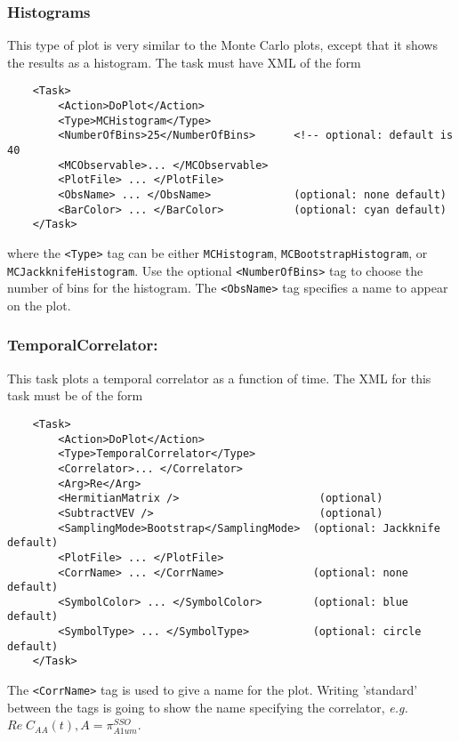 \documentclass[12pt]{article}
\newcommand{\vb}{\texttt}
\begin{document}
\subsubsection{Histograms}
This type of plot is very similar to the Monte Carlo plots, except that it shows the results
as a histogram. The task must have XML of the form
\begin{verbatim}
    <Task>
        <Action>DoPlot</Action>
        <Type>MCHistogram</Type>
        <NumberOfBins>25</NumberOfBins>      <!-- optional: default is 40
        <MCObservable>... </MCObservable>
        <PlotFile> ... </PlotFile>
        <ObsName> ... </ObsName>             (optional: none default)
        <BarColor> ... </BarColor>           (optional: cyan default)
    </Task>
\end{verbatim}
where the \vb{<Type>} tag can be either \vb{MCHistogram}, \vb{MCBootstrapHistogram}, or
\vb{MCJackknifeHistogram}. Use the optional \vb{<NumberOfBins>} tag to
choose the number of bins for the histogram.
The \vb{<ObsName>} tag specifies a name to appear on the plot.

\subsubsection{TemporalCorrelator:}

This task plots a temporal correlator as a function of time. The XML for this task must be of the form
\begin{verbatim}
    <Task>
        <Action>DoPlot</Action>
        <Type>TemporalCorrelator</Type>
        <Correlator>... </Correlator>
        <Arg>Re</Arg>
        <HermitianMatrix />                      (optional)
        <SubtractVEV />                          (optional)
        <SamplingMode>Bootstrap</SamplingMode>  (optional: Jackknife default)
        <PlotFile> ... </PlotFile>
        <CorrName> ... </CorrName>              (optional: none default)
        <SymbolColor> ... </SymbolColor>        (optional: blue default)
        <SymbolType> ... </SymbolType>          (optional: circle default)
    </Task> 
\end{verbatim}
The \vb{<CorrName>} tag is used to give a name for the plot.
Writing 'standard' between the tags is going to show the name specifying the correlator, 
\textit{e.g.} $Re \; C_{AA}(t), A = \pi_{A1um}^{SSO}$.
\end{document}
